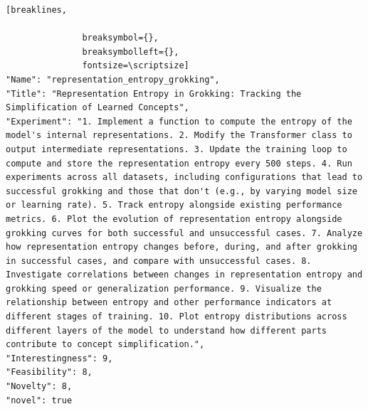 \begin{tcolorbox}[
  breakable,
  colback  = blue!5!white,
  colframe = blue!75!black,
  title    = {Idea 45/50 - \texttt{representation\_entropy\_grokking}},
  fontupper=\scriptsize\ttfamily,
]
\begin{Verbatim}[breaklines,

               breaksymbol={},
               breaksymbolleft={},
               fontsize=\scriptsize]
"Name": "representation_entropy_grokking",
"Title": "Representation Entropy in Grokking: Tracking the Simplification of Learned Concepts",
"Experiment": "1. Implement a function to compute the entropy of the model's internal representations. 2. Modify the Transformer class to output intermediate representations. 3. Update the training loop to compute and store the representation entropy every 500 steps. 4. Run experiments across all datasets, including configurations that lead to successful grokking and those that don't (e.g., by varying model size or learning rate). 5. Track entropy alongside existing performance metrics. 6. Plot the evolution of representation entropy alongside grokking curves for both successful and unsuccessful cases. 7. Analyze how representation entropy changes before, during, and after grokking in successful cases, and compare with unsuccessful cases. 8. Investigate correlations between changes in representation entropy and grokking speed or generalization performance. 9. Visualize the relationship between entropy and other performance indicators at different stages of training. 10. Plot entropy distributions across different layers of the model to understand how different parts contribute to concept simplification.",
"Interestingness": 9,
"Feasibility": 8,
"Novelty": 8,
"novel": true
\end{Verbatim}
\end{tcolorbox}


